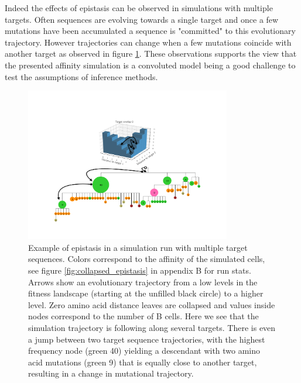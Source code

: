 Indeed the effects of epistasis can be observed in simulations with multiple targets.
Often sequences are evolving towards a single target and once a few mutations have been accumulated a sequence is "committed" to this evolutionary trajectory.
However trajectories can change when a few mutations coincide with another target as observed in figure \ref{fig:epistasis_figure}.
These observations supports the view that the presented affinity simulation is a convoluted model being a good challenge to test the assumptions of inference methods.

\begin{figure}[!ht]
    \begin{center}
    \includegraphics[width=0.8\textwidth]{figures/epistasis_figure.pdf}
        \caption{
        \label{fig:epistasis_figure}
        Example of epistasis in a simulation run with multiple target sequences.
        Colors correspond to the affinity of the simulated cells, see figure \ref{fig:collapsed_epistasis} in appendix B for run stats.
        Arrows show an evolutionary trajectory from a low levels in the fitness landscape (starting at the unfilled black circle) to a higher level.
        Zero amino acid distance leaves are collapsed and values inside nodes correspond to the number of B cells.
        Here we see that the simulation trajectory is following along several targets.
        There is even a jump between two target sequence trajectories, with the highest frequency node (green 40) yielding a descendant with two amino acid mutations (green 9) that is equally close to another target, resulting in a change in mutational trajectory.
        }
    \end{center}
\end{figure}








